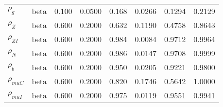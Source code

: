 \begin{center}
\begin{longtable}{llcccccc}
${\rho_g}$ & beta &   0.100 & 0.0500 &   0.168& 0.0266 &  0.1294 &  0.2129 \\ 
${\rho_Z}$ & beta &   0.600 & 0.2000 &   0.632& 0.1190 &  0.4758 &  0.8643 \\ 
${\rho_{ZI}}$ & beta &   0.600 & 0.2000 &   0.984& 0.0084 &  0.9712 &  0.9964 \\ 
${\rho_N}$ & beta &   0.600 & 0.2000 &   0.986& 0.0147 &  0.9708 &  0.9999 \\ 
${\rho_b}$ & beta &   0.600 & 0.2000 &   0.950& 0.0205 &  0.9221 &  0.9800 \\ 
${\rho_{muC}}$ & beta &   0.600 & 0.2000 &   0.820& 0.1746 &  0.5642 &  1.0000 \\ 
${\rho_{muI}}$ & beta &   0.600 & 0.2000 &   0.975& 0.0119 &  0.9551 &  0.9941 \\ 
\end{longtable}
 \end{center}
